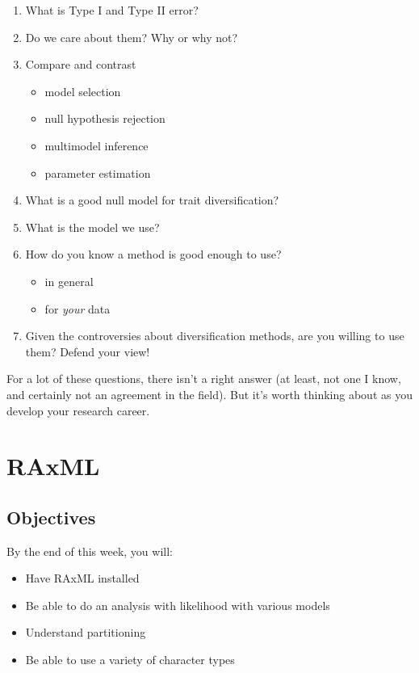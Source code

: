 \documentclass[
]{article}
\providecommand{\tightlist}{%
  \setlength{\itemsep}{0pt}\setlength{\parskip}{0pt}}
\begin{document}
\begin{enumerate}
\def\labelenumi{\arabic{enumi}.}
\tightlist
\item
  What is Type I and Type II error?
\item
  Do we care about them? Why or why not?
\item
  Compare and contrast

  \begin{itemize}
  \tightlist
  \item
    model selection
  \item
    null hypothesis rejection
  \item
    multimodel inference
  \item
    parameter estimation
  \end{itemize}
\item
  What is a good null model for trait diversification?
\item
  What is the model we use?
\item
  How do you know a method is good enough to use?

  \begin{itemize}
  \tightlist
  \item
    in general
  \item
    for \emph{your} data
  \end{itemize}
\item
  Given the controversies about diversification methods, are you willing to use them? Defend your view!
\end{enumerate}

For a lot of these questions, there isn't a right answer (at least, not one I know, and certainly not an agreement in the field). But it's worth thinking about as you develop your research career.

\hypertarget{raxml}{%
\section{RAxML}\label{raxml}}

\hypertarget{objectives-6}{%
\subsection{Objectives}\label{objectives-6}}

By the end of this week, you will:

\begin{itemize}
\tightlist
\item
  Have RAxML installed
\item
  Be able to do an analysis with likelihood with various models
\item
  Understand partitioning
\item
  Be able to use a variety of character types
\end{itemize}
\end{document}
